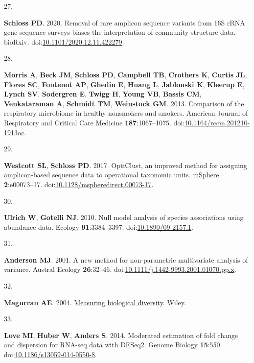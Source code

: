 \documentclass[
]{article}
\newlength{\cslhangindent}
\newlength{\csllabelwidth}
\newlength{\cslentryspacingunit} %
\newenvironment{CSLReferences}[2] %
 {%
  \setlength{\parindent}{0pt}
  \ifodd #1
  \let\oldpar\par
  \def\par{\hangindent=\cslhangindent\oldpar}
  \fi
  \setlength{\parskip}{#2\cslentryspacingunit}
 }%
 {}
\newcommand{\CSLLeftMargin}[1]{\parbox[t]{\csllabelwidth}{#1}}
\newcommand{\CSLRightInline}[1]{\parbox[t]{\linewidth - \csllabelwidth}{#1}\break}
\begin{document}
\begin{CSLReferences}{0}{1}
\leavevmode{}%
\CSLLeftMargin{27. }%
\CSLRightInline{\textbf{Schloss PD}. 2020. Removal of rare amplicon
sequence variants from 16S {rRNA} gene sequence surveys biases the
interpretation of community structure data. bio{R}xiv.
doi:\href{https://doi.org/10.1101/2020.12.11.422279}{10.1101/2020.12.11.422279}.}

\leavevmode{}%
\CSLLeftMargin{28. }%
\CSLRightInline{\textbf{Morris A}, \textbf{Beck JM}, \textbf{Schloss
PD}, \textbf{Campbell TB}, \textbf{Crothers K}, \textbf{Curtis JL},
\textbf{Flores SC}, \textbf{Fontenot AP}, \textbf{Ghedin E},
\textbf{Huang L}, \textbf{Jablonski K}, \textbf{Kleerup E},
\textbf{Lynch SV}, \textbf{Sodergren E}, \textbf{Twigg H}, \textbf{Young
VB}, \textbf{Bassis CM}, \textbf{Venkataraman A}, \textbf{Schmidt TM},
\textbf{Weinstock GM}. 2013. Comparison of the respiratory microbiome in
healthy nonsmokers and smokers. American Journal of Respiratory and
Critical Care Medicine \textbf{187}:1067--1075.
doi:\href{https://doi.org/10.1164/rccm.201210-1913oc}{10.1164/rccm.201210-1913oc}.}

\leavevmode{}%
\CSLLeftMargin{29. }%
\CSLRightInline{\textbf{Westcott SL}, \textbf{Schloss PD}. 2017.
{OptiClust}, an improved method for assigning amplicon-based sequence
data to operational taxonomic units. {mSphere} \textbf{2}:e00073--17.
doi:\href{https://doi.org/10.1128/mspheredirect.00073-17}{10.1128/mspheredirect.00073-17}.}

\leavevmode{}%
\CSLLeftMargin{30. }%
\CSLRightInline{\textbf{Ulrich W}, \textbf{Gotelli NJ}. 2010. Null model
analysis of species associations using abundance data. Ecology
\textbf{91}:3384--3397.
doi:\href{https://doi.org/10.1890/09-2157.1}{10.1890/09-2157.1}.}

\leavevmode{}%
\CSLLeftMargin{31. }%
\CSLRightInline{\textbf{Anderson MJ}. 2001. A new method for
non-parametric multivariate analysis of variance. Austral Ecology
\textbf{26}:32--46.
doi:\href{https://doi.org/10.1111/j.1442-9993.2001.01070.pp.x}{10.1111/j.1442-9993.2001.01070.pp.x}.}

\leavevmode{}%
\CSLLeftMargin{32. }%
\CSLRightInline{\textbf{Magurran AE}. 2004.
\href{https://books.google.com/books?id=tUqzLSUzXxcC}{Measuring
biological diversity}. Wiley.}

\leavevmode{}%
\CSLLeftMargin{33. }%
\CSLRightInline{\textbf{Love MI}, \textbf{Huber W}, \textbf{Anders S}.
2014. Moderated estimation of fold change and dispersion for {RNA}-seq
data with {DESeq}2. Genome Biology \textbf{15}:550.
doi:\href{https://doi.org/10.1186/s13059-014-0550-8}{10.1186/s13059-014-0550-8}.}


\end{CSLReferences}
\end{document}
